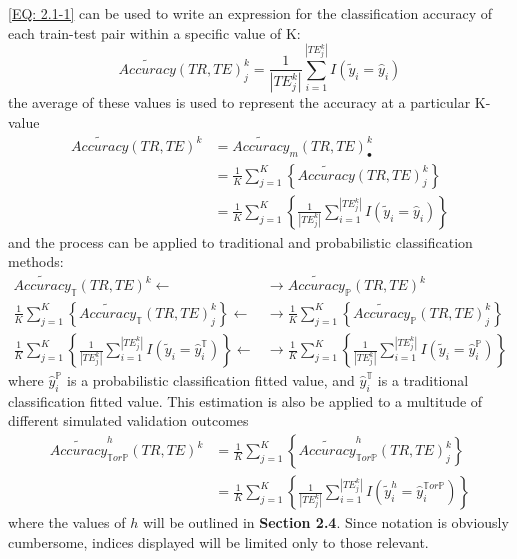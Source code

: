 \documentclass[12pt,]{article}
\begin{document}
\eqref{EQ: 2.1-1} can be used to write an expression for the
classification accuracy of each train-test pair within a specific value
of K:
\[\tilde{Accuracy}\left(TR, TE \right)_{j}^{k}= \frac{1}{|TE_{j}^{k}|} \sum_{i=1}^{|TE_{j}^{k}|} I\left(\tilde{y}_{i}=\hat{y}_{i} \right)\]
the average of these values is used to represent the accuracy at a
particular K-value \begin{align*}
  \tilde{Accuracy}\left(TR, TE \right)^{k} &= \tilde{Accuracy}_{m}\left(TR, TE \right)_{\bullet}^{k} \\
  &=\frac{1}{K}\sum_{j=1}^{K} \left \{ \tilde{Accuracy}\left(TR, TE \right)_{j}^{k}\right \} \\
  &=  \frac{1}{K}\sum_{j=1}^{K} \left \{ \frac{1}{|TE_{j}^{k}|} \sum_{i=1}^{|TE_{j}^{k}|} I\left(\tilde{y}_{i}=\hat{y}_{i} \right) \right \}
\end{align*} and the process can be applied to traditional and
probabilistic classification methods: \begin{align*}
  \tilde{Accuracy}_{\mathbb{T}}\left(TR, TE \right)^{k} \leftarrow & \rightarrow \tilde{Accuracy}_{\mathbb{P}}\left(TR, TE \right)^{k} \\[0.5em]
  \frac{1}{K}\sum_{j=1}^{K} \left \{ \tilde{Accuracy}_{\mathbb{T}}\left(TR, TE \right)_{j}^{k}\right \} \leftarrow & \rightarrow \frac{1}{K}\sum_{j=1}^{K} \left \{ \tilde{Accuracy}_{\mathbb{P}}\left(TR, TE \right)_{j}^{k}\right \} \\[0.5em]
  \frac{1}{K}\sum_{j=1}^{K} \left \{ \frac{1}{|TE_{j}^{k}|} \sum_{i=1}^{|TE_{j}^{k}|} I\left(\tilde{y}_{i}=\hat{y}_{i}^{\mathbb{T}} \right) \right \} \leftarrow & \rightarrow  \frac{1}{K}\sum_{j=1}^{K} \left \{ \frac{1}{|TE_{j}^{k}|} \sum_{i=1}^{|TE_{j}^{k}|} I\left(\tilde{y}_{i}=\hat{y}_{i}^{\mathbb{P}} \right) \right \}
\end{align*} where \(\hat{y}_{i}^{\mathbb{P}}\) is a probabilistic
classification fitted value, and \(\hat{y}_{i}^{\mathbb{T}}\) is a
traditional classification fitted value. This estimation is also be
applied to a multitude of different simulated validation outcomes
\begin{align*}
\tilde{Accuracy}_{\mathbb{T}or\mathbb{P}}^{h}\left(TR, TE \right)^{k} &= \frac{1}{K}\sum_{j=1}^{K} \left \{ \tilde{Accuracy}_{\mathbb{T}or\mathbb{P}}^{h}\left(TR, TE \right)_{j}^{k}\right \} \\[0.5em]
&=  \frac{1}{K}\sum_{j=1}^{K} \left \{ \frac{1}{|TE_{j}^{k}|} \sum_{i=1}^{|TE_{j}^{k}|} I\left(\tilde{y}_{i}^{h}=\hat{y}_{i}^{\mathbb{T}or\mathbb{P}} \right) \right \}
\end{align*} where the values of \(h\) will be outlined in
\textbf{Section 2.4}. Since notation is obviously cumbersome, indices
displayed will be limited only to those relevant.
\end{document}
